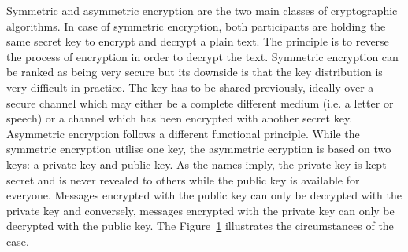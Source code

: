 Symmetric and asymmetric encryption are the two main classes of cryptographic algorithms.
In case of symmetric encryption, both participants are holding the same secret key to encrypt and decrypt a plain text.
The principle is to reverse the process of encryption in order to decrypt the text.
Symmetric encryption can be ranked as being very secure but its downside is that the key distribution is very difficult in practice.
The key has to be shared previously, ideally over a secure channel which may either be a complete different medium (i.e. a letter or speech) or a channel which has been encrypted with another secret key.
Asymmetric encryption follows a different functional principle.
While the symmetric encryption utilise one key, the asymmetric ecryption is based on two keys: a private key and public key.
As the names imply, the private key is kept secret and is never revealed to others while the public key is available for everyone.
Messages encrypted with the public key can only be decrypted with the private key and conversely, messages encrypted with the private key can only be decrypted with the public key. 
The Figure~\ref{fig:asymmetric_encryption} illustrates the circumstances of the case.\\
\begin{figure}[htb]
	\centering%
	\\
	\label{fig:asymmetric_encryption}
\end{figure}



